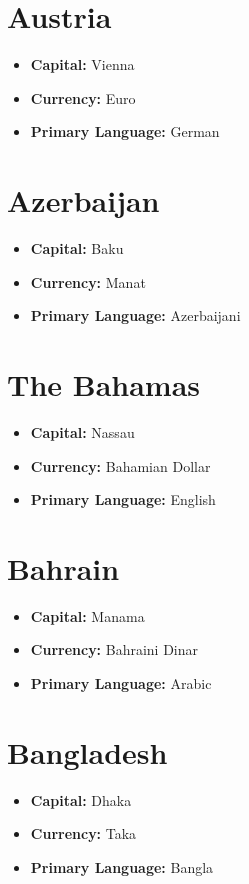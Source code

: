 \documentclass[a4paper,100pt,twoside]{book}
\begin{document}
\section*{\Huge Austria}
\vspace{5mm} %
\begin{itemize}
	\item \textbf{Capital:} Vienna
	\item \textbf{Currency:} Euro
	\item \textbf{Primary Language:} German
\end{itemize}

\section*{\Huge Azerbaijan}
\vspace{5mm} %
\begin{itemize}
	\item \textbf{Capital:} Baku
	\item \textbf{Currency:} Manat
	\item \textbf{Primary Language:} Azerbaijani
\end{itemize}

\section*{\Huge The Bahamas}
\vspace{5mm} %
\begin{itemize}
	\item \textbf{Capital:} Nassau
	\item \textbf{Currency:} Bahamian Dollar
	\item \textbf{Primary Language:} English
\end{itemize}

\section*{\Huge Bahrain}
\vspace{5mm} %
\begin{itemize}
	\item \textbf{Capital:} Manama
	\item \textbf{Currency:} Bahraini Dinar
	\item \textbf{Primary Language:} Arabic
\end{itemize}

\section*{\Huge Bangladesh}
\vspace{5mm} %
\begin{itemize}
	\item \textbf{Capital:} Dhaka
	\item \textbf{Currency:} Taka
	\item \textbf{Primary Language:} Bangla
\end{itemize}
\end{document}
